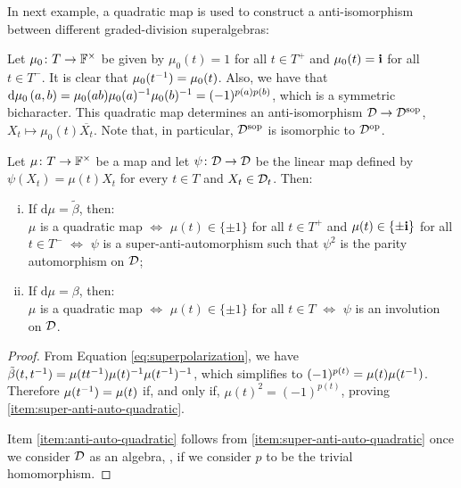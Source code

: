In next example, a quadratic map is used to construct a anti-isomorphism between different graded-division superalgebras:

\begin{ex}\label{ex:quadratic-form-polarization-parity}
	Let $\mu_0\colon T \to \mathbb{F}^\times$ be given by $\mu_0(t) = 1$ for all $t\in T^+$ and $\mu_0(t) = \mathbf{i}$ for all $t\in T^-$.
	It is clear that $\mu_0(t^{-1}) = \mu_0(t)$.
	Also, we have that $\mathrm{d}\mu_0 \, (a,b) = \mu_0(ab) \mu_0(a)^{-1} \mu_0(b)^{-1} = (-1)^{p(a)p(b)}$, which is a symmetric bicharacter. 
	This quadratic map determines an anti-isomorphism $\mathcal{D} \to \mathcal{D}^{\mathrm{sop}}$, $X_t\mapsto \mu_0(t)\overline{X_t}$. 
	Note that, in particular, $\mathcal{D}^{\mathrm{sop}}$ is isomorphic to $\mathcal{D}^{\mathrm{op}}$.
\end{ex}

\begin{lemma}\label{lemma:quadratic-form-involutions}
	Let $\mu\colon T \to \mathbb{F}^\times$ be a map and let $\psi\colon \mathcal{D} \to \mathcal{D}$ be the linear map defined by
	$\psi(X_t) = \mu(t) X_t$ for every $t\in T$ and $X_t \in \mathcal{D}_t$.
	Then:
	\begin{enumerate}[(i)]
		\item If $\mathrm{d}\mu = \tilde\beta$, then: \\
		      $\mu$ is a quadratic map $\iff$ $\mu(t)\in \{ \pm 1 \}$ for all $t \in T^+$ and $\mu(t)\in \{ \pm \mathbf{i} \}$ for all $t \in T^-$ $\iff$ $\psi$ is a super-anti-automorphism such that $\psi^2$ is the parity automorphism on $\mathcal{D}$; \label{item:super-anti-auto-quadratic}
		\item If $\mathrm{d}\mu = \beta$, then:\\
		      $\mu$ is a quadratic map $\iff$ $\mu(t) \in \{\pm 1\}$ for all $t\in T$ $\iff$ $\psi$ is
		      an involution on $\mathcal{D}$. \label{item:anti-auto-quadratic}
	\end{enumerate}
\end{lemma}

\begin{proof}
	From Equation \eqref{eq:superpolarization}, we have $\tilde\beta (t, t^{-1}) = \mu (tt^{-1}) \mu(t)^{-1} \mu(t^{-1})^{-1}$, which simplifies to $(-1)^{p(t)} = \mu(t)\mu(t^{-1})$.
	Therefore $\mu(t^{-1}) = \mu(t)$ if, and only if, $\mu(t)^2 = (-1)^{p(t)}$, proving \eqref{item:super-anti-auto-quadratic}.

	Item \eqref{item:anti-auto-quadratic} follows from \eqref{item:super-anti-auto-quadratic} once we consider $\mathcal{D}$ as an algebra, \ie, if we consider $p$ to be the trivial homomorphism.
\end{proof}

